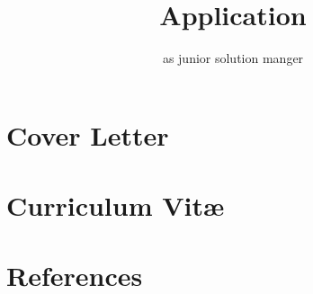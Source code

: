 \documentclass[
  a4paper,    %
  english,    %
  tag_style       = skilltag_border,
  highlight_color = 107896,
  light_color     = 677073,
  default_color   = 001E26,
  tag_style       = skilltag_border,
  style           = decent,
  portrait_shape  = circle,
  marginparwidth  = 4cm,
  portrait_ratio  = 0.9,
  header          = false,
]{application}
\title{Application}
\subtitle{as junior solution manger}
\begin{document}
\maketitle

\tableofcontents
\chapter{Cover Letter}


\chapter{Curriculum Vit\ae}


\chapter{References}
\printreferences
\end{document}
